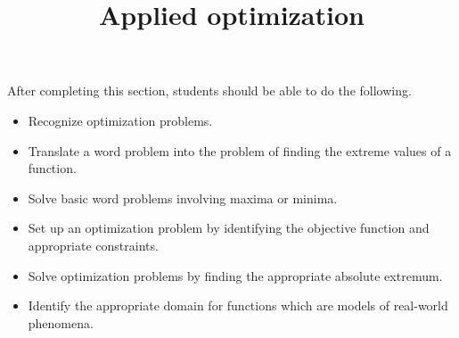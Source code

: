\documentclass{ximera}
\title{Applied optimization}
\begin{document}
\begin{abstract}
\end{abstract}

\maketitle

\begin{sectionOutcomes}

After completing this section, students should be able to do the following.

\begin{itemize}
\item Recognize optimization problems.
\item Translate a word problem into the problem of finding the extreme values of a function.
\item Solve basic word problems involving maxima or minima.
\item Set up an optimization problem by identifying the objective function and appropriate constraints.
\item Solve optimization problems by finding the appropriate absolute extremum.
\item Identify the appropriate domain for functions which are models of real-world phenomena.   
\end{itemize}

\end{sectionOutcomes}
\end{document}
